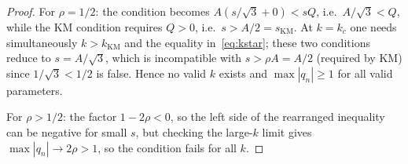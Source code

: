 \documentclass[10pt,a4paper]{amsart}
\begin{document}
\begin{proof}
For $\rho=1/2$: the condition becomes $A(s/\sqrt{3}+0)<sQ$, i.e.\ $A/\sqrt{3}<Q$,
while the KM condition requires $Q>0$, i.e.\ $s>A/2=s_{\mathrm{KM}}$.
At $k=k_c$ one needs simultaneously $k>k_{\mathrm{KM}}$ and the
equality in~\eqref{eq:kstar}; these two conditions reduce to $s=A/\sqrt{3}$,
which is incompatible with $s>\rho A=A/2$ (required by KM) since
$1/\sqrt{3}<1/2$ is false.  Hence no valid $k$ exists and $\max|q_n|\geq1$
for all valid parameters.
 
For $\rho>1/2$: the factor $1-2\rho<0$, so the left side of the
rearranged inequality can be negative for small $s$, but checking the
large-$k$ limit gives $\max|q_n|\to 2\rho>1$, so the condition fails
for all $k$.
\end{proof}
\end{document}
